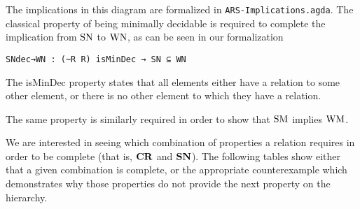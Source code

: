 The implications in this diagram are formalized in \texttt{ARS-Implications.agda}. The classical property of being minimally decidable is 
required to complete the implication from $\mathrm{SN}$ to $\mathrm{WN}$, as can be seen in our formalization 

\verb|SNdec→WN : (~R R) isMinDec → SN ⊆ WN| 
 
The isMinDec property  states that all elements either have a relation to some other element, or 
there is no other element to which they have a relation.  

The same property is similarly required in order to show that $\mathrm{SM}$ implies $\mathrm{WM}$.

We are interested in seeing which combination of properties a relation requires in order to be complete (that is, $\mathbf{CR}$ and $\mathbf{SN}$). 
The following tables show either that a given combination is complete, or the appropriate counterexample which demonstrates why 
those properties do not provide the next property on the hierarchy. 

